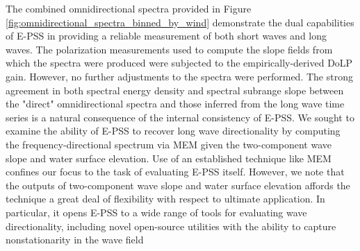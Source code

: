 \documentclass[letterpaper,journal]{IEEEtran}
\begin{document}
	The combined omnidirectional spectra provided in Figure \ref{fig:omnidirectional_spectra_binned_by_wind} demonstrate the dual capabilities of E-PSS in providing a reliable measurement of both short waves and long waves. The polarization measurements used to compute the slope fields from which the spectra were produced were subjected to the empirically-derived DoLP gain. However, no further adjustments to the spectra were performed. The strong agreement in both spectral energy density and spectral subrange slope between the "direct" omnidirectional spectra and those inferred from the long wave time series is a natural consequence of the internal consistency of E-PSS. We sought to examine the ability of E-PSS to recover long wave directionality by computing the frequency-directional spectrum via MEM \cite{lygre_maximum_1986} given the two-component wave slope and water surface elevation. Use of an established technique like MEM confines our focus to the task of evaluating E-PSS itself. However, we note that the outputs of two-component wave slope and water surface elevation affords the technique a great deal of flexibility with respect to ultimate application. In particular, it opens E-PSS to a wide range of tools for evaluating wave directionality, including novel open-source utilities with the ability to capture nonstationarity in the wave field \cite{pelaez-zapata_ocean_2024,pelaez-zapata_ewdm_2025}
	
\end{document}
